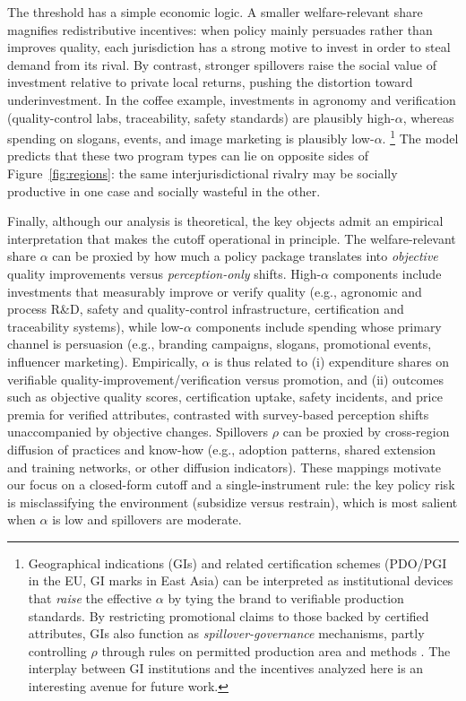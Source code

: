 \documentclass[sn-mathphys-ay]{sn-jnl} %
\theoremstyle{remark}
\begin{document}
The threshold has a simple economic logic.
A smaller welfare-relevant share magnifies redistributive incentives: when policy mainly persuades rather than improves quality, each jurisdiction has a strong motive to invest in order to steal demand from its rival.
By contrast, stronger spillovers raise the social value of investment relative to private local returns, pushing the distortion toward underinvestment.
In the coffee example, investments in agronomy and verification (quality-control labs, traceability, safety standards) are plausibly high-$\alpha$, whereas spending on slogans, events, and image marketing is plausibly low-$\alpha$.%
\footnote{Geographical indications (GIs) and related certification schemes (PDO/PGI in the EU, GI marks in East Asia) can be interpreted as institutional devices that \emph{raise} the effective $\alpha$ by tying the brand to verifiable production standards. By restricting promotional claims to those backed by certified attributes, GIs also function as \emph{spillover-governance} mechanisms, partly controlling $\rho$ through rules on permitted production area and methods \citep{CrespiMarette2003}. The interplay between GI institutions and the incentives analyzed here is an interesting avenue for future work.}
The model predicts that these two program types can lie on opposite sides of Figure~\ref{fig:regions}: the same interjurisdictional rivalry may be socially productive in one case and socially wasteful in the other.

Finally, although our analysis is theoretical, the key objects admit an empirical interpretation that makes the cutoff operational in principle.
The welfare-relevant share $\alpha$ can be proxied by how much a policy package translates into \emph{objective} quality improvements versus \emph{perception-only} shifts.
High-$\alpha$ components include investments that measurably improve or verify quality (e.g., agronomic and process R\&D, safety and quality-control infrastructure, certification and traceability systems), while low-$\alpha$ components include spending whose primary channel is persuasion (e.g., branding campaigns, slogans, promotional events, influencer marketing).
Empirically, $\alpha$ is thus related to (i) expenditure shares on verifiable quality-improvement/verification versus promotion, and (ii) outcomes such as objective quality scores, certification uptake, safety incidents, and price premia for verified attributes, contrasted with survey-based perception shifts unaccompanied by objective changes.
Spillovers $\rho$ can be proxied by cross-region diffusion of practices and know-how (e.g., adoption patterns, shared extension and training networks, or other diffusion indicators).
These mappings motivate our focus on a closed-form cutoff and a single-instrument rule: the key policy risk is misclassifying the environment (subsidize versus restrain), which is most salient when $\alpha$ is low and spillovers are moderate.
\end{document}
